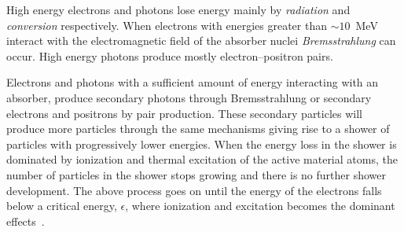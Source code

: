 High energy electrons and photons lose energy mainly by \emph{radiation} and
\emph{conversion} respectively. When electrons with energies greater than
$\sim 10$~MeV interact with the electromagnetic field of the absorber nuclei
\emph{Bremsstrahlung} can occur. High energy photons produce mostly
electron--positron pairs.

Electrons and photons with a sufficient amount of energy interacting with an
absorber, produce secondary photons through Bremsstrahlung or secondary
electrons and positrons by pair production. These secondary particles will
produce more particles through the same mechanisms giving rise to a shower of
particles with progressively lower energies. When the energy loss in the shower
is dominated by ionization and thermal excitation of the active material atoms,
the number of particles in the shower stops growing and there is no further
shower development. The above process goes on until the energy of the electrons
falls below a critical energy, $\epsilon$, where ionization and excitation
becomes the dominant effects~\cite{Calorimetry}.
